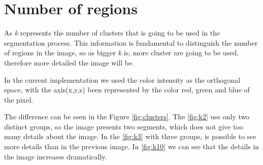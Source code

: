 \documentclass{article}
\begin{document}
\section{Number of regions}

As \emph{k} represents the number of clusters that is going to be used in the segmentation process. 
This information is fundamental to distinguish the number of regions in the image, so as bigger \emph{k} is, more cluster are going to be used, therefore more detailed the image will be.  

In the current implementation we used the color intensity as the orthogonal space, with the axis(x,y,z) been represented by the color red, green and blue of the pixel.

The difference can be seen in the Figure \ref{fig:clusters}. The \ref{fig:k2} use only two distinct groups, so the image presents two segments, which does not give too many details about the image.  In the \ref{fig:k3} with three groups, is possible to see more details than in the previous image. In \ref{fig:k10} we can see that the details in the image increases dramatically.
\end{document}

